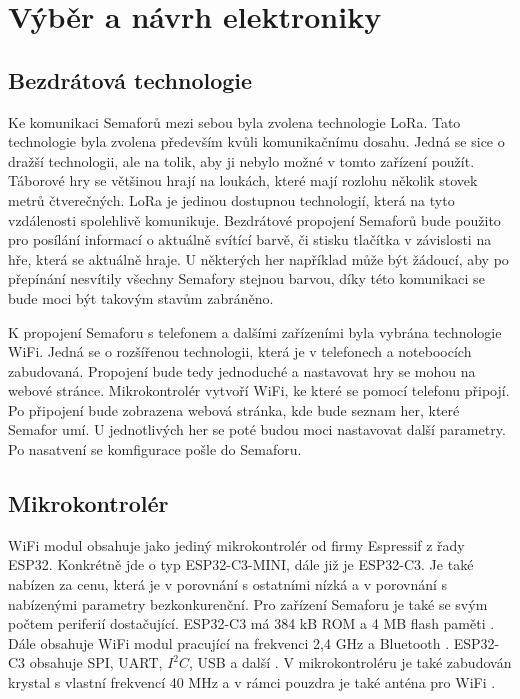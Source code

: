 \chapter{Výběr a návrh elektroniky}

\section{Bezdrátová technologie}
Ke komunikaci Semaforů mezi sebou byla zvolena technologie LoRa. Tato technologie byla zvolena především kvůli komunikačnímu dosahu. Jedná se sice o dražší technologii, 
ale na tolik, aby ji nebylo možné v tomto zařízení použít. Táborové hry se většinou hrají na loukách, které mají rozlohu několik stovek metrů čtverečných. LoRa je jedinou
dostupnou technologií, která na tyto vzdálenosti spolehlivě komunikuje. Bezdrátové propojení Semaforů bude použito pro posílání informací o aktuálně svítící barvě, či 
stisku tlačítka v závislosti na hře, která se aktuálně hraje. U některých her například může být žádoucí, aby po přepínání nesvítily všechny Semafory stejnou barvou,
díky této komunikaci se bude moci být takovým stavům zabráněno. 

K propojení Semaforu s telefonem a dalšími zařízeními byla vybrána technologie WiFi. Jedná se o rozšířenou technologii, která je v telefonech a noteboocích zabudovaná. 
Propojení bude tedy jednoduché a nastavovat hry se mohou na webové stránce. Mikrokontrolér vytvoří WiFi, ke které se pomocí telefonu připojí. Po připojení bude zobrazena
webová stránka, kde bude seznam her, které Semafor umí. U jednotlivých her se poté budou moci nastavovat další parametry. Po nasatvení se komfigurace pošle do Semaforu. 

\section{Mikrokontrolér}
WiFi modul obsahuje jako jediný mikrokontrolér od firmy Espressif z řady ESP32. Konkrétně jde o typ ESP32-C3-MINI, dále již je ESP32-C3. Je také nabízen za cenu, která 
je v porovnání s ostatními nízká a v porovnání s nabízenými parametry bezkonkurenční. Pro zařízení Semaforu je také se svým počtem periferií dostačující. ESP32-C3 má 
384 kB ROM a 4 MB flash paměti \cite{ESP_C3_dtsh}. Dále obsahuje WiFi modul pracující na frekvenci 2,4 GHz a Bluetooth \cite{ESP_C3_dtsh}. ESP32-C3 obsahuje SPI, UART, 
$I^2C$, USB a další \cite{ESP_C3_dtsh}. V mikrokontroléru je také zabudován krystal s vlastní frekvencí 40 MHz a v rámci pouzdra je také anténa pro WiFi \cite{ESP_C3_dtsh}.

